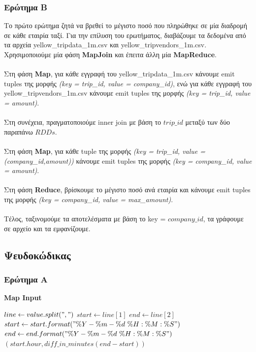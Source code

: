 \documentclass{ntua}
\begin{document}
\subsubsection{Ερώτημα Β}
Το πρώτο ερώτημα ζητά να βρεθεί το μέγιστο ποσό που πληρώθηκε σε μία διαδρομή σε κάθε εταιρία ταξί. Για την επίλυση του ερωτήματος, διαβάζουμε τα δεδομένα από τα αρχεία yellow\_tripdata\_1m.csv και yellow\_tripvendors\_1m.csv. Χρησιμοποιούμε μία φάση \textbf{MapJoin} και έπειτα άλλη μία \textbf{MapReduce}. \\ \\ 
Στη φάση \textbf{Map}, για κάθε εγγραφή του yellow\_tripdata\_1m.csv κάνουμε emit tuples της μορφής \emph{(key = trip\_id, value = company\_id)}, ενώ για κάθε εγγραφή του yellow\_tripvendors\_1m.csv κάνουμε emit tuples της μορφής \emph{(key = trip\_id, value = amount)}. \\ \\
Στη συνέχεια, πραγματοποιούμε inner join με βάση το $trip\_id$ μεταξύ των δύο παραπάνω $RDDs$.\\ \\ 
Στη φάση \textbf{Map}, για κάθε tuple της μορφής \emph{(key = trip\_id, value = (company\_id,amount))} κάνουμε emit tuples της μορφής \emph{(key = company\_id, value = amount)}.\\ \\
Στη φάση \textbf{Reduce}, βρίσκουμε το μέγιστο ποσό ανά εταιρία και κάνουμε emit tuples της μορφής \emph{(key = company\_id, value = max\_amount)}. \\ \\
Τέλος, ταξινομούμε τα αποτελέσματα με βάση το key = $company\_id$, τα γράφουμε σε αρχείο και τα εμφανίζουμε.

\subsection{Ψευδοκώδικας}

\subsubsection{Ερώτημα Α}
\begin{algorithm}[H]
\caption*{\bfseries{Map Input}}
\begin{algorithmic}[1]
	\State $line\gets value.split(",")$
	\State $start\gets line[1]$
	\State $end\gets line[2]$
	\State $start\gets start.format("\%Y-\%m-\%d\ \%H:\%M:\%S")$
	\State $end\gets end.format("\%Y-\%m-\%d\ \%H:\%M:\%S")$
	\Emit $(start.hour, diff\_in\_minutes(end - start))$
\EndFunction
\end{algorithmic}
\end{algorithm}
\end{document}
